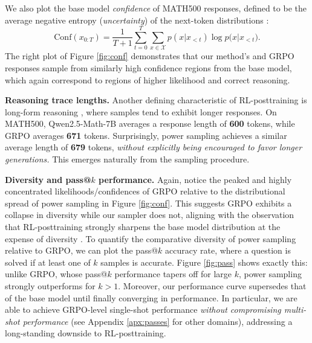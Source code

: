 \documentclass{article}
\renewcommand{\paragraph}[1]{\vspace{.1em}\noindent\textbf{#1}}
\begin{document}
We also plot the base model \textit{confidence} of  MATH500 responses, defined to be the average negative entropy (\textit{uncertainty}) of the next-token distributions \citep{prabhudesai2025maximizingconfidence}:
\begin{equation}
    \text{Conf}(x_{0:T}) = \frac{1}{T+1}\sum_{t=0}^T\sum_{x \in \mathcal{X}}p(x | x_{<t}) \log{p(x | x_{<t}}).
\end{equation}The right plot of Figure \ref{fig:conf} demonstrates that our method's and GRPO responses sample from similarly high confidence regions from the base model, which again correspond to regions of higher likelihood and correct reasoning.  

\paragraph{Reasoning trace lengths.} Another defining characteristic of RL-posttraining is long-form reasoning \citep{guo2025deepseekr1}, where samples tend to exhibit longer responses. On MATH500, Qwen2.5-Math-7B averages a response length of \textbf{600} tokens, while GRPO averages \textbf{671} tokens. Surprisingly, power sampling achieves a similar average length of \textbf{679} tokens, \textit{without explicitly being encouraged to favor longer generations.}  This emerges naturally from the sampling procedure.



\paragraph{Diversity and pass@$k$ performance.} Again, notice the peaked and highly concentrated likelihoods/confidences of GRPO relative to the distributional spread of power sampling in Figure \ref{fig:conf}. This suggests GRPO exhibits a collapse in diversity while our sampler does not, aligning with the observation that RL-posttraining strongly sharpens the base model distribution at the expense of diversity \citep{song2025-outcomebasedexploration}. To quantify the comparative diversity of power sampling relative to GRPO, we can plot the pass@$k$ accuracy rate, where a question is solved if at least one of $k$ samples is accurate. Figure \ref{fig:pass} shows exactly this: unlike GRPO, whose pass@$k$ performance tapers off for large $k$, power sampling strongly outperforms for $k > 1$. Moreover, our performance curve supersedes that of the base model until finally converging in performance. In particular, we are able to achieve GRPO-level single-shot performance \textit{without compromising multi-shot performance} (see Appendix \ref{apx:passes} for other domains), addressing a long-standing downside to RL-posttraining.
\end{document}
